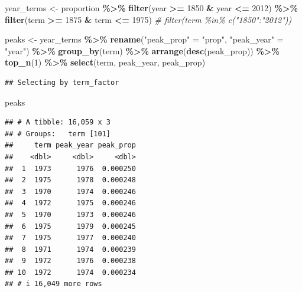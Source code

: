 \documentclass[
]{article}
\newenvironment{Shaded}{\begin{snugshade}}{\end{snugshade}}
\newcommand{\CommentTok}[1]{\textcolor[rgb]{0.56,0.35,0.01}{\textit{#1}}}
\newcommand{\DecValTok}[1]{\textcolor[rgb]{0.00,0.00,0.81}{#1}}
\newcommand{\FunctionTok}[1]{\textcolor[rgb]{0.13,0.29,0.53}{\textbf{#1}}}
\newcommand{\NormalTok}[1]{#1}
\newcommand{\OtherTok}[1]{\textcolor[rgb]{0.56,0.35,0.01}{#1}}
\newcommand{\SpecialCharTok}[1]{\textcolor[rgb]{0.81,0.36,0.00}{\textbf{#1}}}
\newcommand{\StringTok}[1]{\textcolor[rgb]{0.31,0.60,0.02}{#1}}
\begin{document}
\begin{Shaded}
\begin{Highlighting}[]
\NormalTok{year\_terms }\OtherTok{\textless{}{-}}\NormalTok{ proportion }\SpecialCharTok{\%\textgreater{}\%}
  \FunctionTok{filter}\NormalTok{(year }\SpecialCharTok{\textgreater{}=} \DecValTok{1850} \SpecialCharTok{\&}\NormalTok{ year }\SpecialCharTok{\textless{}=} \DecValTok{2012}\NormalTok{) }\SpecialCharTok{\%\textgreater{}\%} 
  \FunctionTok{filter}\NormalTok{(term }\SpecialCharTok{\textgreater{}=} \StringTok{\textquotesingle{}1875\textquotesingle{}} \SpecialCharTok{\&}\NormalTok{ term }\SpecialCharTok{\textless{}=} \StringTok{\textquotesingle{}1975\textquotesingle{}}\NormalTok{)}
  \CommentTok{\# filter(term \%in\% c("1850":"2012"))}

\NormalTok{peaks }\OtherTok{\textless{}{-}}\NormalTok{ year\_terms }\SpecialCharTok{\%\textgreater{}\%} 
  \FunctionTok{rename}\NormalTok{(}\StringTok{"peak\_prop"} \OtherTok{=} \StringTok{"prop"}\NormalTok{, }\StringTok{"peak\_year"} \OtherTok{=} \StringTok{"year"}\NormalTok{) }\SpecialCharTok{\%\textgreater{}\%}
  \FunctionTok{group\_by}\NormalTok{(term) }\SpecialCharTok{\%\textgreater{}\%} 
  \FunctionTok{arrange}\NormalTok{(}\FunctionTok{desc}\NormalTok{(peak\_prop)) }\SpecialCharTok{\%\textgreater{}\%}
  \FunctionTok{top\_n}\NormalTok{(}\DecValTok{1}\NormalTok{) }\SpecialCharTok{\%\textgreater{}\%}
  \FunctionTok{select}\NormalTok{(term, peak\_year, peak\_prop)}
\end{Highlighting}
\end{Shaded}

\begin{verbatim}
## Selecting by term_factor
\end{verbatim}

\begin{Shaded}
\begin{Highlighting}[]
\NormalTok{peaks}
\end{Highlighting}
\end{Shaded}

\begin{verbatim}
## # A tibble: 16,059 x 3
## # Groups:   term [101]
##     term peak_year peak_prop
##    <dbl>     <dbl>     <dbl>
##  1  1973      1976  0.000250
##  2  1975      1978  0.000248
##  3  1970      1974  0.000246
##  4  1972      1975  0.000246
##  5  1970      1973  0.000246
##  6  1975      1979  0.000245
##  7  1975      1977  0.000240
##  8  1971      1974  0.000239
##  9  1972      1976  0.000238
## 10  1972      1974  0.000234
## # i 16,049 more rows
\end{verbatim}
\end{document}
